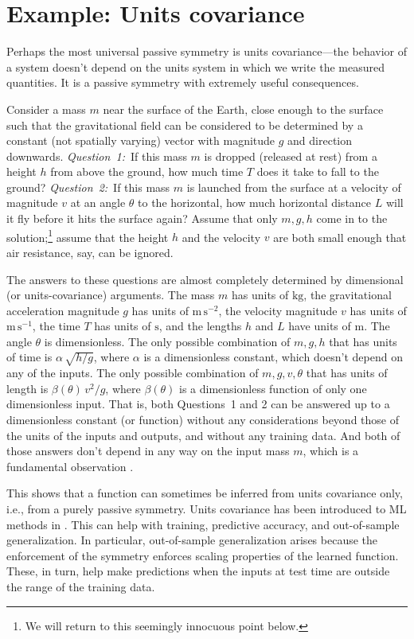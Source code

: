 \documentclass{article}
\theoremstyle{plain}
\theoremstyle{definition}
\theoremstyle{remark}
\newcommand{\unit}[1]{\mathrm{#1}}
\newcommand{\kg}{\unit{kg}}
\newcommand{\m}{\unit{m}}
\newcommand{\s}{\unit{s}}
\begin{document}
\section{Example: Units covariance}\label{sec:units}

Perhaps the most universal 
passive symmetry is units covariance---the behavior of a system doesn't depend on the units system in which we write the measured quantities.
It is a passive symmetry with extremely useful consequences.

Consider a mass $m$ near the surface of the Earth, close enough to the surface such that the gravitational field can be considered to be determined by a constant (not spatially varying) vector with magnitude $g$ and direction downwards.
\textsl{Question~1:}~If this mass $m$ is dropped (released at rest) from a height $h$ from above the ground, how much time $T$ does it take to fall to the ground?
\textsl{Question~2:}~If this mass $m$ is launched from the surface at a velocity of magnitude $v$ at an angle $\theta$ to the horizontal, how much horizontal distance $L$ will it fly before it hits the surface again?
Assume that only $m, g, h$ come in to the solution;\footnote{We will return to this seemingly innocuous point below.} assume that the height $h$ and the velocity $v$ are both small enough that air resistance, say, can be ignored.


The answers to these questions are almost completely determined by dimensional (or units-covariance) arguments.
The mass $m$ has units of $\kg$, the gravitational acceleration magnitude $g$ has units of $\m\,\s^{-2}$, the velocity magnitude $v$ has units of $\m\,\s^{-1}$, the time $T$ has units of $\s$, and the lengths $h$ and $L$ have units of $\m$.
The angle $\theta$ is dimensionless.
The only possible combination of $m, g, h$ that has units of time is $\alpha\,\sqrt{h/g}$, where $\alpha$ is a dimensionless constant, which doesn't depend on any of the inputs.
The only possible combination of $m, g, v, \theta$ that has units of length is $\beta(\theta)\,v^2/g$, where $\beta(\theta)$ is a dimensionless function of only one dimensionless input.
That is, both Questions~1 and 2 can be answered up to a dimensionless constant (or function) without any considerations beyond those of the units of the inputs and outputs, and without any training data.
And both of those answers don't depend in any way on the input mass $m$, which is a fundamental observation \cite{gr}.

This shows that a function can sometimes be inferred from units covariance only, i.e., from a purely passive symmetry.
Units covariance has been introduced to ML methods in \cite{villar2022dimensionless, bakarji2022dimensionally, xie2022data}.
This can help with training, predictive accuracy, and out-of-sample generalization.
In particular, out-of-sample generalization arises because the enforcement of the symmetry enforces scaling properties of the learned function.
These, in turn, help make predictions when the inputs at test time are outside the range of the training data.
\end{document}
